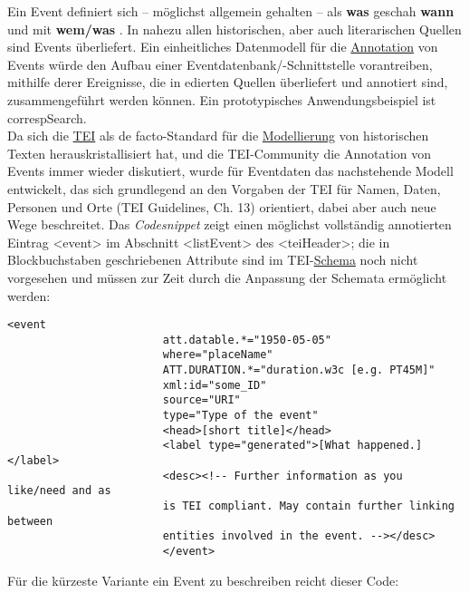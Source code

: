 \documentclass{article}
\begin{document}
    Ein Event definiert sich – möglichst allgemein gehalten – als \textbf{was}  geschah \textbf{wann}  und mit \textbf{wem/was} . In nahezu allen historischen, aber auch literarischen Quellen
                     sind Events überliefert. Ein einheitliches Datenmodell für die \href{http://gams.uni-graz.at/o:konde.17}{Annotation} von Events würde den
                     Aufbau einer Eventdatenbank/-Schnittstelle vorantreiben, mithilfe derer
                     Ereignisse, die in edierten Quellen überliefert und annotiert sind,
                     zusammengeführt werden können. Ein prototypisches Anwendungsbeispiel ist correspSearch.\\
            
        Da sich die \href{http://gams.uni-graz.at/o:konde.178}{TEI} als de
                     facto-Standard für die \href{http://gams.uni-graz.at/o:konde.137}{Modellierung} von historischen Texten herauskristallisiert hat, und die
                     TEI-Community die Annotation von Events immer wieder diskutiert, wurde für
                     Eventdaten das nachstehende Modell entwickelt, das sich grundlegend an den
                     Vorgaben der TEI für Namen, Daten, Personen und Orte (TEI Guidelines, Ch.
                        13) orientiert, dabei aber auch neue Wege beschreitet. Das \emph{Codesnippet} zeigt einen möglichst vollständig annotierten
                     Eintrag <event> im Abschnitt <listEvent> des
                     <teiHeader>; die in Blockbuchstaben geschriebenen Attribute
                     sind im TEI-\href{http://gams.uni-graz.at/o:konde.166}{Schema} noch nicht
                     vorgesehen und müssen zur Zeit durch die Anpassung der Schemata ermöglicht
                     werden:\\
            
        \begin{verbatim}<event
                        att.datable.*="1950-05-05"
                        where="placeName"
                        ATT.DURATION.*="duration.w3c [e.g. PT45M]"
                        xml:id="some_ID"
                        source="URI"
                        type="Type of the event"
                        <head>[short title]</head>
                        <label type="generated">[What happened.]</label>
                        <desc><!-- Further information as you like/need and as
                        is TEI compliant. May contain further linking between 
                        entities involved in the event. --></desc>
                        </event>\end{verbatim}Für die kürzeste Variante ein Event zu beschreiben reicht dieser Code:\\
            
\end{document}
